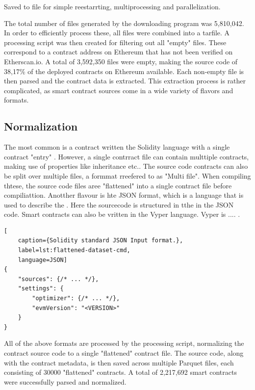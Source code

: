 Saved to file for simple reestarrting, multiprocessing and parallelization.

The total number of files generated by the downloading program was 5,810,042. In order to efficiently process these, all files were combined into a tarfile. A processing script was then created for filtering out all "empty" files. These correspond to a contract address on Ethereum that has not been verified on Etherscan.io. A total of 3,592,350 files were empty, making the source code of 38,17\% of the deployed contracts on Ethereum available. Each non-empty file is then parsed and the contract data is extracted. This extraction process is rather complicated, as smart contract sources come in a wide variety of flavors and formats.

\subsection{Normalization}
The most common is a contract written the Solidity language with  a single contract "entry"  . However, a single contrract file can contain multtiple contracts, making use of properties like inheritance etc.. The source code contracts can also be split over multiple files, a formmat rreefered to as "Multi file". When compiling thtese, the source code files aree "flattened" into a single contract file before compiliattion. Anotther flavour is hte JSON format, which is a language that is used to describe the . Here the sourcecode is structured in tthe in the JSON code. Smart contracts can also be vritten in the Vyper language. Vyper is .... .


\begin{lstlisting}[
    caption={Solidity standard JSON Input format.},
    label=lst:flattened-dataset-cmd,
    language=JSON]
{
    "sources": {/* ... */},
    "settings": {
        "optimizer": {/* ... */},
        "evmVersion": "<VERSION>"
    }
}
\end{lstlisting}

All of the above formats are processed by the processing script, normalizing the contract source code to a single "flattened" contract file. The source code, along with the contract metadata, is then saved across multiple Parquet files, each consisting of 30000 "flattened" contracts. A total of 2,217,692 smart contracts were successfully parsed and normalized.

